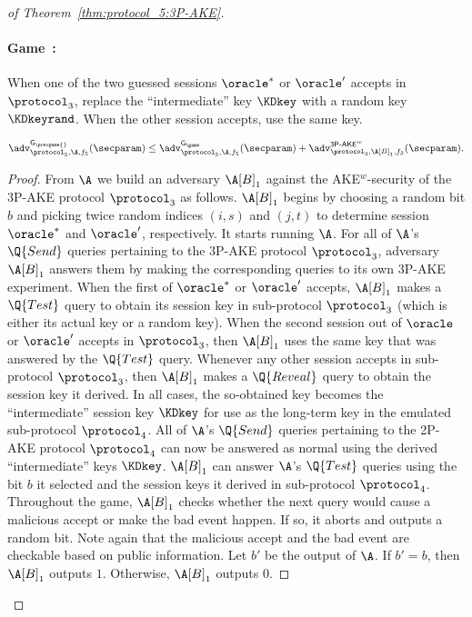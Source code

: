 \begin{proof}[of Theorem~\ref{thm:protocol_5:3P-AKE}]
\newgame
\paragraph{Game~\game:}
When one of the two guessed sessions $\oracle^*$ or $\oracle'$ accepts in $\protocol_3$, 
replace the ``intermediate'' key $\KDkey$
with a random key $\KDkeyrand$. 
When the other session accepts, use the same key.

\begin{lemma}\label{lemma:3P-AKE:3P-KD-swap-random}
$
	\adv_{\protocol_5,\A,f_5}^{\mathsf{G_{\prevgame{}}}}(\secparam) 
	\leq \adv_{\protocol_5,\A,f_5}^{\mathsf{G_\game}}(\secparam) 
	+ \adv_{\protocol_3, \A[B]_1,f_3}^{\operatorname{\mathsf{3P-AKE}}^w}(\secparam)  .
$
\end{lemma}


\begin{proof}
From $\A$ we build an adversary $\A[B]_1$ against the AKE$^w$-security of the 3P-AKE protocol $\protocol_3$ as follows.
$\A[B]_1$ begins by choosing a random bit $b$ and picking twice random indices $(i,s)$ and $(j,t)$ to determine
session $\oracle^*$ and $\oracle'$, respectively. It starts running $\A$.
For all of $\A$'s $\Q{Send}$ queries pertaining to the 3P-AKE protocol $\protocol_3$,
adversary $\A[B]_1$ answers them by making the corresponding queries to its own 3P-AKE experiment. 
When the first of $\oracle^*$ or $\oracle'$ accepts, $\A[B]_1$ makes a $\Q{Test}$ query to obtain its session key in sub-protocol $\protocol_3$
(which is either its actual key or a random key).
When the second session out of $\oracle$ or $\oracle'$ accepts in $\protocol_3$, 
then $\A[B]_1$ uses the same key that was answered by the $\Q{Test}$ query.
Whenever any other session accepts in sub-protocol $\protocol_3$, then
$\A[B]_1$ makes a $\Q{Reveal}$ query to obtain the session key it derived.
In all cases, the so-obtained key becomes the ``intermediate'' session key $\KDkey$ for use as the long-term key in the emulated sub-protocol $\protocol_4$. All of $\A$'s $\Q{Send}$ queries pertaining to the 2P-AKE protocol $\protocol_4$ can now be answered as normal using the derived ``intermediate'' keys $\KDkey$. 
$\A[B]_1$ can answer $\A$'s $\Q{Test}$ queries using the bit $b$ it selected and the session keys it derived in sub-protocol $\protocol_4$.
Throughout the game, $\A[B]_1$ checks whether the next query would cause a malicious accept or make the bad event happen. If so, it aborts and outputs a random bit. Note again that the malicious accept and the bad event are checkable based on public information.
Let $b'$ be the output of $\A$.
If $b' = b$,
then $\A[B]_1$ outputs $1$.
Otherwise, $\A[B]_1$ outputs $0$.


\end{proof}
\end{proof}
